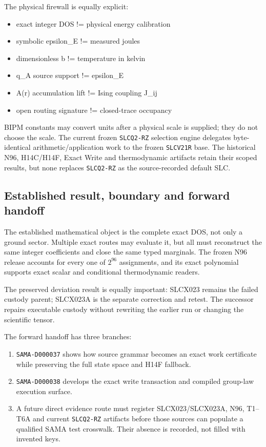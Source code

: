 The physical firewall is equally explicit:

\begin{itemize}
\tightlist
\item
  exact integer DOS != physical energy calibration
\item
  symbolic epsilon\_E != measured joules
\item
  dimensionless b != temperature in kelvin
\item
  q\_A source support != epsilon\_E
\item
  A(r) accumulation lift != Ising coupling J\_ij
\item
  open routing signature != closed-trace occupancy
\end{itemize}

BIPM constants may convert units after a physical scale is supplied;
they do not choose the scale. The current frozen \texttt{SLCQ2-RZ}
selection engine delegates byte-identical arithmetic/application work to
the frozen \texttt{SLCV21R} base. The historical N96, H14C/H14F, Exact
Write and thermodynamic artifacts retain their scoped results, but none
replaces \texttt{SLCQ2-RZ} as the source-recorded default SLC.

\subsection{Established result, boundary and forward
handoff}\label{viii-ch03-established-result-boundary-and-forward-handoff}

The established mathematical object is the complete exact DOS, not only
a ground sector. Multiple exact routes may evaluate it, but all must
reconstruct the same integer coefficients and close the same typed
marginals. The frozen N96 release accounts for every one of \(2^{96}\)
assignments, and its exact polynomial supports exact scalar and
conditional thermodynamic readers.

The preserved deviation result is equally important: SLCX023 remains the
failed custody parent; SLCX023A is the separate correction and retest.
The successor repairs executable custody without rewriting the earlier
run or changing the scientific tensor.

The forward handoff has three branches:

\begin{enumerate}
\def\labelenumi{\arabic{enumi}.}
\tightlist
\item
  \texttt{SAMA-D000037} shows how source grammar becomes an exact work
  certificate while preserving the full state space and H14F fallback.
\item
  \texttt{SAMA-D000038} develops the exact write transaction and
  compiled group-law execution surface.
\item
  A future direct evidence route must register SLCX023/SLCX023A, N96,
  T1--T6A and current \texttt{SLCQ2-RZ} artifacts before those sources
  can populate a qualified SAMA test crosswalk. Their absence is
  recorded, not filled with invented keys.
\end{enumerate}

